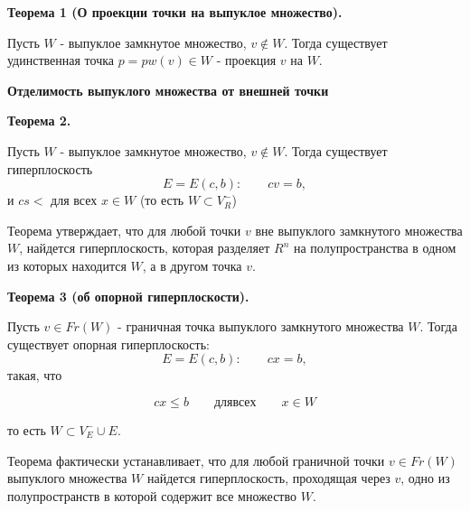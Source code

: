 \documentclass[14pt, letterpaper]{article}
\begin{document}
\textbf{Теорема 1 (О проекции точки на выпуклое множество).}

Пусть $W$ - выпуклое замкнутое множество, $v \notin W$. Тогда существует удинственная точка $p = pw(v) \in W$ - проекция $v$ на $W$.

\textbf{Отделимость выпуклого множества от внешней точки}


\textbf{Теорема 2.}

Пусть $W$ - выпуклое замкнутое множество, $v \notin W$. Тогда существует гиперплоскость
    $$ E = E(c, b): \qquad  cv = b,$$
и $cs \lt$ для всех $x \in W$ (то есть $W \subset V^{-}_{R}$)

Теорема утверждает, что для любой точки $v$ вне выпуклого замкнутого множества $W$, найдется гиперплоскость, которая разделяет $R^{n}$ на полупространства в одном из которых находится $W$, а в другом точка $v$.

\textbf{Теорема 3 (об опорной гиперплоскости).}

Пусть $v \in Fr(W)$ - граничная точка выпуклого замкнутого множества $W$. Тогда существует опорная гиперплоскость:
$$E = E(c, b): \qquad cx = b,$$
такая, что

$$cx \leq b \qquad для всех \qquad x \in W$$

то есть $W \subset V^{-}_{E} \cup E.$

Теорема фактически устанавливает, что для любой граничной точки $v \in Fr(W)$ выпуклого множества $W$ найдется гиперплоскость, проходящая через $v$, одно из полупространств в которой содержит все множество $W$.
\end{document}
